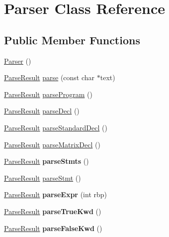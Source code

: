 \hypertarget{classParser}{\section{Parser Class Reference}
\label{classParser}
}
\subsection*{Public Member Functions}
\begin{DoxyCompactItemize}
\item 
\hyperlink{classParser_a12234f6cd36b61af4b50c94a179422c1}{Parser} ()
\item 
\hyperlink{classParseResult}{Parse\-Result} \hyperlink{classParser_a2c1a7aa0b09a43bc1eef460817efb1d6}{parse} (const char $\ast$text)
\item 
\hyperlink{classParseResult}{Parse\-Result} \hyperlink{classParser_a14e25c84322809e2f060dc530362ea71}{parse\-Program} ()
\item 
\hyperlink{classParseResult}{Parse\-Result} \hyperlink{classParser_ac646227983887c1cd13dae67fa1bc142}{parse\-Decl} ()
\item 
\hyperlink{classParseResult}{Parse\-Result} \hyperlink{classParser_a1e1f83c0f4b11148a356d951f191425e}{parse\-Standard\-Decl} ()
\item 
\hyperlink{classParseResult}{Parse\-Result} \hyperlink{classParser_a3a00df25fda2af308b69f05eed14ac69}{parse\-Matrix\-Decl} ()
\item 
\hypertarget{classParser_a452db3def31683cb0305e57a01489bd4}{\hyperlink{classParseResult}{Parse\-Result} {\bfseries parse\-Stmts} ()}\label{classParser_a452db3def31683cb0305e57a01489bd4}

\item 
\hyperlink{classParseResult}{Parse\-Result} \hyperlink{classParser_a9709c4793d0cce012d595f3ee416cd25}{parse\-Stmt} ()
\item 
\hypertarget{classParser_a50227dc24dc7a175ac0533d9957dfcf8}{\hyperlink{classParseResult}{Parse\-Result} {\bfseries parse\-Expr} (int rbp)}\label{classParser_a50227dc24dc7a175ac0533d9957dfcf8}

\item 
\hypertarget{classParser_ad40f1e5e4c66814f959d982f94b767a3}{\hyperlink{classParseResult}{Parse\-Result} {\bfseries parse\-True\-Kwd} ()}\label{classParser_ad40f1e5e4c66814f959d982f94b767a3}

\item 
\hypertarget{classParser_a56f03d2e70d12648c55ce56a11e63324}{\hyperlink{classParseResult}{Parse\-Result} {\bfseries parse\-False\-Kwd} ()}\label{classParser_a56f03d2e70d12648c55ce56a11e63324}


\end{DoxyCompactItemize}
